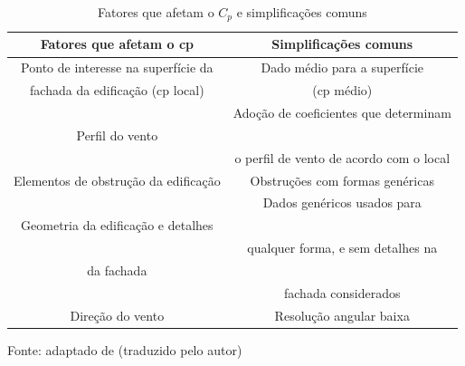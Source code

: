 \documentclass[brazil,hardcopy,openany]{ufscthesis} %
\newcommand{\source}[1]{\small \caption*{Fonte: {#1}} } %
\begin{document}
\begin{table}[h]
	\caption{Fatores que afetam o $C_p$ e simplificações comuns}
	\label{tab:CpSimp}
	\centering
		\begin{tabular}{|c |c |} %
			\hline	
			\textbf{Fatores que afetam o \acrshort{cp}} & \textbf{Simplificações comuns} \\
			\hline
			Ponto de interesse na superfície da & Dado médio para a superfície \\
			fachada da edificação (\acrshort{cp} local) & (\acrshort{cp} médio)\\
			\hline
			{} & Adoção de coeficientes que determinam \vspace{-5pt}\\
			Perfil do vento & {} \vspace{-7pt}\\
			{} & o perfil de vento de acordo com o local \\
			\hline
			Elementos de obstrução da edificação & Obstruções com formas genéricas  \\
			\hline
			{} & Dados genéricos usados para \vspace{-5pt} \\
			Geometria da edificação e detalhes & {} \vspace{-7pt} \\
			{} & qualquer forma, e sem detalhes na \vspace{-5pt} \\
			da fachada & {} \vspace{-7pt} \\
			{} & fachada considerados \\
			\hline
			Direção do vento & Resolução angular baixa \\
			\hline
			
		\end{tabular}
	\source{adaptado de  (traduzido pelo autor)}
\end{table}
\end{document}
